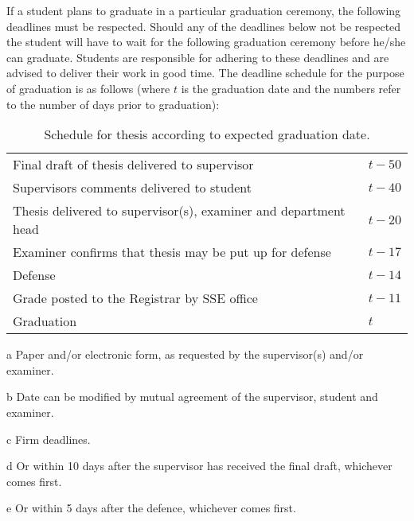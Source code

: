 If a student plans to graduate in a particular graduation ceremony, the following deadlines must be respected.
Should any of the deadlines below not be respected the student will have to wait for the following graduation ceremony before he/she can graduate.
Students are responsible for adhering to these deadlines and are advised to deliver their work in good time.
The deadline schedule for the purpose of graduation is as follows (where $t$ is the graduation date and the
numbers refer to the number of days prior to graduation):
\begin{table}[h]
  \centering
  \begin{threeparttable}
\begin{tabular}{ll}
 Final draft of thesis delivered to supervisor\tnote{a} &$t-50$\tnote{b}\\
 Supervisors comments delivered to student &$t-40$\tnote{c,d}\\
 Thesis delivered to supervisor(s), examiner and department head\tnote{a} &$t-20$\tnote{c}\\
 Examiner confirms that thesis may be put up for defense &$t-17$\tnote{c}\\
 Defense &$t-14$\tnote{c}\\
 Grade posted to the Registrar by SSE office &$t-11$\tnote{c}\\
 Graduation &$t$\tnote{c}\\
\end{tabular}
\begin{tablenotes}
\item[a] Paper and/or electronic form, as requested by the supervisor(s) and/or examiner.
\item[b] Date can be modified by mutual agreement of the supervisor, student and examiner.
\item[c] Firm deadlines.
\item[d] Or within 10 days after the supervisor has received the final draft, whichever comes first.
\item[e] Or within 5 days after the defence, whichever comes first.
\end{tablenotes}
\caption{Schedule for thesis according to expected graduation date.}
\end{threeparttable}
\end{table}

